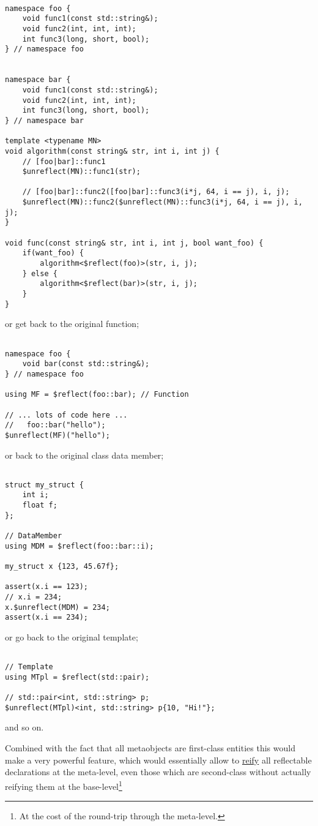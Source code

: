 \begin{verbatim}

namespace foo {
	void func1(const std::string&);
	void func2(int, int, int);
	int func3(long, short, bool);
} // namespace foo


namespace bar {
	void func1(const std::string&);
	void func2(int, int, int);
	int func3(long, short, bool);
} // namespace bar

template <typename MN>
void algorithm(const string& str, int i, int j) {
	// [foo|bar]::func1
	$unreflect(MN)::func1(str);

	// [foo|bar]::func2([foo|bar]::func3(i*j, 64, i == j), i, j);
	$unreflect(MN)::func2($unreflect(MN)::func3(i*j, 64, i == j), i, j);
}

void func(const string& str, int i, int j, bool want_foo) {
	if(want_foo) {
		algorithm<$reflect(foo)>(str, i, j);
	} else {
		algorithm<$reflect(bar)>(str, i, j);
	}
}

\end{verbatim}

or get back to the original function;

\begin{verbatim}

namespace foo {
	void bar(const std::string&);
} // namespace foo

using MF = $reflect(foo::bar); // Function

// ... lots of code here ...
//   foo::bar("hello");
$unreflect(MF)("hello");

\end{verbatim}

or back to the original class data member;

\begin{verbatim}

struct my_struct {
	int i;
	float f;
};

// DataMember
using MDM = $reflect(foo::bar::i);

my_struct x {123, 45.67f};

assert(x.i == 123);
// x.i = 234;
x.$unreflect(MDM) = 234;
assert(x.i == 234);

\end{verbatim}

or go back to the original template;

\begin{verbatim}

// Template
using MTpl = $reflect(std::pair);

// std::pair<int, std::string> p;
$unreflect(MTpl)<int, std::string> p{10, "Hi!"};

\end{verbatim}

and so on.

Combined with the fact that all metaobjects are first-class
entities this would make a very powerful feature, which would essentially
allow to \hyperref[term-reification]{reify} all reflectable declarations at
the meta-level, even those which are
second-class without actually reifying them at the base-level\footnote
{At the cost of the round-trip through the meta-level.}

